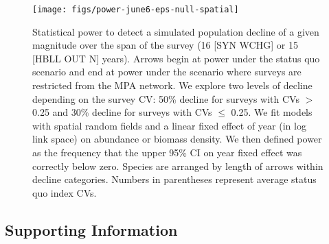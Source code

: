 \documentclass[12pt]{article}
\begin{document}
\clearpage

\begin{figure}[htb]
    \centering
    \texttt{[image: figs/power-june6-eps-null-spatial]}
    \caption{Statistical power to detect a simulated population decline of a given magnitude over the span of the survey (16 [SYN WCHG] or 15 [HBLL OUT N] years). Arrows begin at power under the status quo scenario and end at power under the scenario where surveys are restricted from the MPA network. We explore two levels of decline depending on the survey CV: 50\% decline for surveys with CVs $>$ 0.25 and 30\% decline for surveys with CVs $\le$ 0.25. We fit models with spatial random fields and a linear fixed effect of year (in log link space) on abundance or biomass density. We then defined power as the frequency that the upper 95\% CI on year fixed effect was correctly below zero. Species are arranged by length of arrows within decline categories. Numbers in parentheses represent average status quo index CVs.}
    \label{fig:power}
\end{figure}



\renewcommand{\thefigure}{S\arabic{figure}}
\renewcommand{\thetable}{S\arabic{table}}
\setcounter{figure}{0}
\setcounter{table}{0}
\setcounter{section}{0}
\setcounter{subsection}{0}
\setcounter{subsubsection}{0}

\clearpage

\appendix


\setcounter{secnumdepth}{0} %

\onehalfspacing
\linenumbers
\resetlinenumber
\setcounter{page}{1}
\setcounter{equation}{0}
\nolinenumbers

\begin{Center}
\section*{Supporting Information}
\end{Center}
\end{document}
